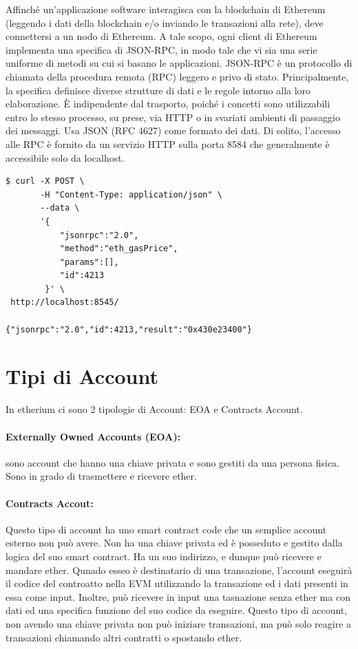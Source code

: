 Affinché un'applicazione software interagisca con la blockchain di Ethereum
(leggendo i dati della blockchain e/o inviando le transazioni alla rete), deve connettersi a
un nodo di Ethereum.
A tale scopo, ogni client di Ethereum implementa una specifica di JSON-RPC, in modo tale che vi
sia una serie uniforme di metodi su cui si basano le applicazioni.
JSON-RPC è un protocollo di chiamata della procedura remota (RPC) leggero e privo di stato.
Principalmente, la specifica definisce diverse strutture di dati e le regole intorno alla loro
elaborazione. È indipendente dal trasporto, poiché i concetti sono utilizzabili entro lo stesso
processo, su prese, via HTTP o in svariati ambienti di passaggio dei messaggi. Usa JSON (RFC 4627)
come formato dei dati.
Di solito, l'accesso alle RPC è fornito da un servizio HTTP sulla porta 8584 che
generalmente è accessibile solo da localhost.

\begin{lstlisting}[caption=Esempio di richiesta tramite jsonrpc]
$ curl -X POST \ 
       -H "Content-Type: application/json" \  
       --data \
       '{
           "jsonrpc":"2.0",
           "method":"eth_gasPrice",
           "params":[],
           "id":4213
        }' \
 http://localhost:8545/
 
{"jsonrpc":"2.0","id":4213,"result":"0x430e23400"}
\end{lstlisting}

\section{Tipi di Account}
In etherium ci sono 2 tipologie di Account: EOA e Contracts Account.

\paragraph{Externally Owned Accounts (EOA):}
sono account che hanno una chiave privata e sono gestiti da una persona fisica.
Sono in grado di trasmettere e ricevere ether.

\paragraph{Contracts Accout:}
Questo tipo di account ha uno smart contract code che un semplice account esterno non può avere.
Non ha una chiave privata ed è posseduto e gestito dalla logica del suo smart contract.
Ha un suo indirizzo, e dunque può ricevere e mandare ether.
Qunado esseo è destinatario di una transazione, l'account eseguirà il codice del controatto
nella EVM utilizzando la transazione ed i dati presenti in essa come input.
Inoltre, può ricevere in input una tasnazione senza ether ma con dati ed una specifica
funzione del suo codice da eseguire. Questo tipo di account, non avendo una chiave privata
non può iniziare transazioni, ma può solo reagire a transazioni chiamando altri contratti o
spostando ether.

